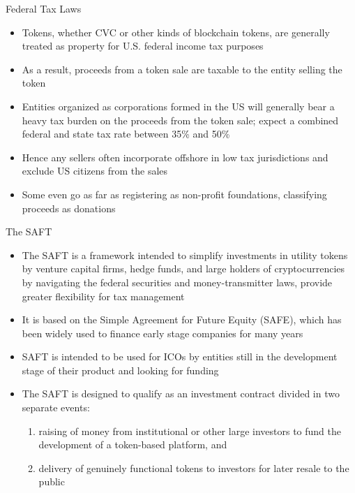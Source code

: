 \documentclass[10pt]{beamer}
\begin{document}

\begin{frame}{Federal Tax Laws}
	\begin{itemize}
		\item Tokens, whether CVC or other kinds of blockchain tokens, are generally treated as property for U.S. federal income tax purposes
		\item As a result, proceeds from a token sale are taxable to the entity selling the token
		\item Entities organized as corporations formed in the US will generally bear a heavy tax burden on the proceeds from the token sale; expect a combined federal and state tax rate between 35\% and 50\%
		\item Hence any sellers often incorporate offshore in low tax jurisdictions and exclude US citizens from the sales
		\item Some even go as far as registering as non-profit foundations, classifying proceeds as donations
	\end{itemize}
\end{frame}


\begin{frame}{The SAFT}
	\begin{itemize}
		\item The SAFT is a framework intended to simplify investments in utility tokens by venture capital firms, hedge funds, and large holders of cryptocurrencies by navigating the federal securities and money-transmitter laws, provide greater flexibility for tax management
		\item It is based on the Simple Agreement for Future Equity (SAFE), which has been widely used to finance early stage companies for many years
		\item SAFT is intended to be used for ICOs by entities still in the development stage of their product and looking for funding
		\item The SAFT is designed to qualify as an investment contract divided in two separate events:
		\begin{enumerate}
			\item raising of money from institutional or other large investors to fund the development of a token-based platform, and
			\item delivery of genuinely functional tokens to investors for later resale to the public
		\end{enumerate}
	\end{itemize}
\end{frame}
\end{document}
